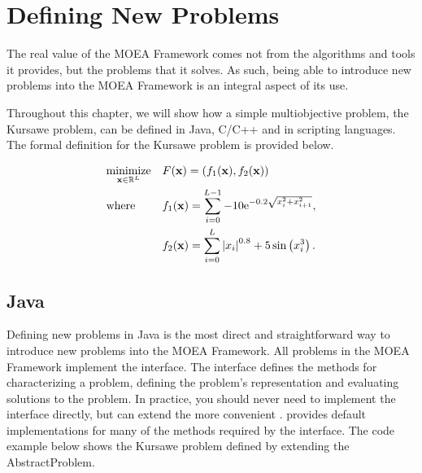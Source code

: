 %
%

\chapter{Defining New Problems}

The real value of the MOEA Framework comes not from the algorithms and tools it provides, but the problems that it solves.  As such, being able to introduce new problems into the MOEA Framework is an integral aspect of its use.

Throughout this chapter, we will show how a simple multiobjective problem, the Kursawe problem, can be defined in Java, C/C++ and in scripting languages.  The formal definition for the Kursawe problem is provided below.

\begin{equation}
  \label{eq:mop}
  \begin{aligned}
    & \underset{\mathbf{x} \in \mathbb{R}^L}{\text{minimize}}
      & & F(\mathbf{x}) = (f_1(\mathbf{x}), f_2(\mathbf{x})) \\
    & \text{where}
      & & f_1(\mathbf{x}) = \sum_{i=0}^{L-1} -10\text{e}^{-0.2\sqrt{x_i^2 + x_{i+1}^2}}, \\
    & & & f_2(\mathbf{x}) = \sum_{i=0}^{L} \left|x_i\right|^{0.8} + 5\sin\left(x_i^3\right).
  \end{aligned}
\end{equation}

\section{Java}
Defining new problems in Java is the most direct and straightforward way to introduce new problems into the MOEA Framework.  All problems in the MOEA Framework implement the  interface.  The  interface defines the methods for characterizing a problem, defining the problem's representation and evaluating solutions to the problem.  In practice, you should never need to implement the  interface directly, but can extend the more convenient .   provides default implementations for many of the methods required by the  interface.  The code example below shows the Kursawe problem defined by extending the AbstractProblem.

